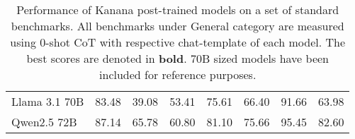 \begin{table}[h]
{\begin{tabular}{l|ccc|cc|cc}
\midrule\midrule
Llama 3.1 70B & 83.48 & 39.08 & 53.41 & 75.61 & 66.40 & 91.66 & 63.98 \\
Qwen2.5 72B & 87.14 & 65.78 & 60.80 & 81.10 & 75.66 & 95.45 & 82.60 \\
\bottomrule
\end{tabular}
}
\caption{
Performance of Kanana post-trained models on a set of standard benchmarks. 
All benchmarks under General category are measured using 0-shot CoT with respective chat-template of each model.
The best scores are denoted in \textbf{bold}.
70B sized models have been included for reference purposes.
}\label{table:chat-eval-1}
\end{table}